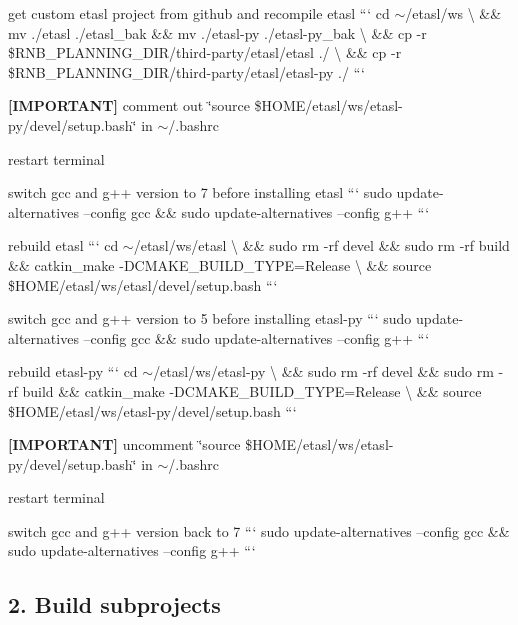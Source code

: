 \begin{DoxyItemize}
\item get custom etasl project from github and recompile etasl ``` cd $\sim$/etasl/ws \textbackslash{} \&\& mv ./etasl ./etasl\+\_\+bak \&\& mv ./etasl-\/py ./etasl-\/py\+\_\+bak \textbackslash{} \&\& cp -\/r \$\+R\+N\+B\+\_\+\+P\+L\+A\+N\+N\+I\+N\+G\+\_\+\+D\+IR/third-\/party/etasl/etasl ./ \textbackslash{} \&\& cp -\/r \$\+R\+N\+B\+\_\+\+P\+L\+A\+N\+N\+I\+N\+G\+\_\+\+D\+IR/third-\/party/etasl/etasl-\/py ./ ```
\item {\bfseries \mbox{[}I\+M\+P\+O\+R\+T\+A\+NT\mbox{]}} comment out \char`\"{}source \$\+H\+O\+M\+E/etasl/ws/etasl-\/py/devel/setup.\+bash\char`\"{} in $\sim$/.bashrc
\item restart terminal
\item switch gcc and g++ version to 7 before installing etasl ``` sudo update-\/alternatives --config gcc \&\& sudo update-\/alternatives --config g++ ```
\item rebuild etasl ``` cd $\sim$/etasl/ws/etasl \textbackslash{} \&\& sudo rm -\/rf devel \&\& sudo rm -\/rf build \&\& catkin\+\_\+make -\/\+D\+C\+M\+A\+K\+E\+\_\+\+B\+U\+I\+L\+D\+\_\+\+T\+Y\+PE=Release \textbackslash{} \&\& source \$\+H\+O\+ME/etasl/ws/etasl/devel/setup.bash ```
\item switch gcc and g++ version to 5 before installing etasl-\/py ``` sudo update-\/alternatives --config gcc \&\& sudo update-\/alternatives --config g++ ```
\item rebuild etasl-\/py ``` cd $\sim$/etasl/ws/etasl-\/py \textbackslash{} \&\& sudo rm -\/rf devel \&\& sudo rm -\/rf build \&\& catkin\+\_\+make -\/\+D\+C\+M\+A\+K\+E\+\_\+\+B\+U\+I\+L\+D\+\_\+\+T\+Y\+PE=Release \textbackslash{} \&\& source \$\+H\+O\+ME/etasl/ws/etasl-\/py/devel/setup.bash ```
\item {\bfseries \mbox{[}I\+M\+P\+O\+R\+T\+A\+NT\mbox{]}} uncomment \char`\"{}source \$\+H\+O\+M\+E/etasl/ws/etasl-\/py/devel/setup.\+bash\char`\"{} in $\sim$/.bashrc
\item restart terminal
\item switch gcc and g++ version back to 7 ``` sudo update-\/alternatives --config gcc \&\& sudo update-\/alternatives --config g++ ```
\end{DoxyItemize}

\subsection*{2. Build subprojects}



